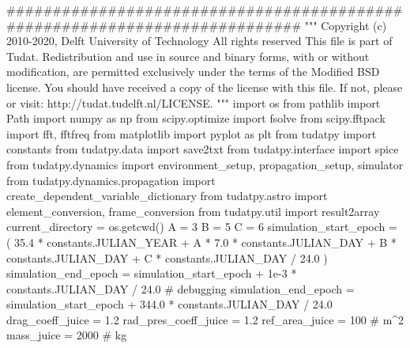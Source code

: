 {}
\markdownRendererSectionEnd \markdownRendererSectionBegin
\markdownRendererHeadingOne{}\markdownRendererInterblockSeparator
{}
\markdownRendererSectionEnd \markdownRendererSectionBegin
{}\markdownRendererInterblockSeparator
{}
\markdownRendererSectionEnd \markdownRendererSectionBegin
\markdownRendererHeadingOne{}\markdownRendererInterblockSeparator
{}########################################################################### """ Copyright (c) 2010-2020, Delft University of Technology All rights reserved This file is part of Tudat. Redistribution and use in source and binary forms, with or without modification, are permitted exclusively under the terms of the Modified BSD license. You should have received a copy of the license with this file. If not, please or visit: http://tudat.tudelft.nl/LICENSE. """ import os from pathlib import Path import numpy as np from scipy.optimize import fsolve from scipy.fftpack import fft, fftfreq from matplotlib import pyplot as plt from tudatpy import constants from tudatpy.data import save2txt from tudatpy.interface import spice from tudatpy.dynamics import environment_setup, propagation_setup, simulator from tudatpy.dynamics.propagation import create_dependent_variable_dictionary from tudatpy.astro import element_conversion, frame_conversion from tudatpy.util import result2array\markdownRendererInterblockSeparator
{}
\markdownRendererSectionEnd \markdownRendererSectionBegin
{}\markdownRendererInterblockSeparator
{}current_directory = os.getcwd()\markdownRendererInterblockSeparator
{}
\markdownRendererSectionEnd \markdownRendererSectionBegin
{}\markdownRendererInterblockSeparator
{}A = 3 B = 5 C = 6 simulation_start_epoch = ( 35.4 * constants.JULIAN_YEAR + A * 7.0 * constants.JULIAN_DAY + B * constants.JULIAN_DAY + C * constants.JULIAN_DAY / 24.0 ) simulation_end_epoch = simulation_start_epoch + 1e-3 * constants.JULIAN_DAY / 24.0 # debugging simulation_end_epoch = simulation_start_epoch + 344.0 * constants.JULIAN_DAY / 24.0\markdownRendererInterblockSeparator
{}
\markdownRendererSectionEnd \markdownRendererSectionBegin
{}\markdownRendererInterblockSeparator
{}
\markdownRendererSectionEnd \markdownRendererSectionBegin
{}\markdownRendererInterblockSeparator
{}drag_coeff_juice = 1.2 rad_pres_coeff_juice = 1.2 ref_area_juice = 100 # m^2 mass_juice = 2000 # kg\markdownRendererInterblockSeparator
